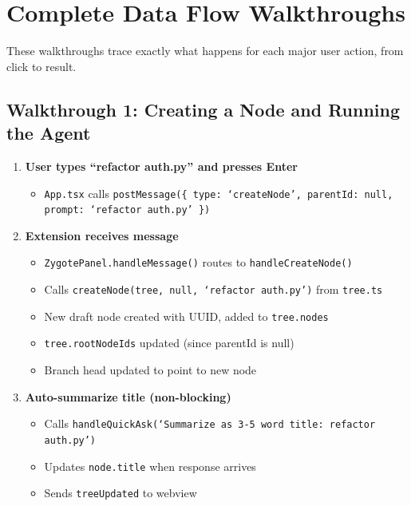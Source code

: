 \documentclass[12pt, a4paper]{article}
\begin{document}
\section{Complete Data Flow Walkthroughs}

These walkthroughs trace exactly what happens for each major user action, from click to result.

\subsection{Walkthrough 1: Creating a Node and Running the Agent}

\begin{enumerate}[label=\textbf{Step \arabic*:}, leftmargin=3cm]
    \item \textbf{User types ``refactor auth.py'' and presses Enter}
    \begin{itemize}
        \item \texttt{App.tsx} calls \texttt{postMessage(\{ type: `createNode', parentId: null, prompt: `refactor auth.py' \})}
    \end{itemize}

    \item \textbf{Extension receives message}
    \begin{itemize}
        \item \texttt{ZygotePanel.handleMessage()} routes to \texttt{handleCreateNode()}
        \item Calls \texttt{createNode(tree, null, `refactor auth.py')} from \texttt{tree.ts}
        \item New draft node created with UUID, added to \texttt{tree.nodes}
        \item \texttt{tree.rootNodeIds} updated (since parentId is null)
        \item Branch head updated to point to new node
    \end{itemize}

    \item \textbf{Auto-summarize title (non-blocking)}
    \begin{itemize}
        \item Calls \texttt{handleQuickAsk(`Summarize as 3-5 word title: refactor auth.py')}
        \item Updates \texttt{node.title} when response arrives
        \item Sends \texttt{treeUpdated} to webview
    \end{itemize}


\end{enumerate}
\end{document}
